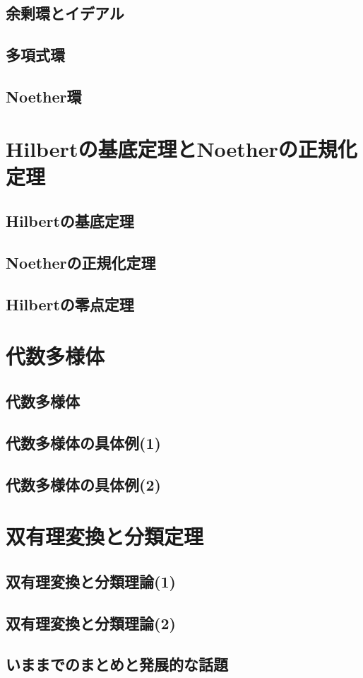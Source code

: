 \documentclass[dvipdfmx, leqno]{jsreport}
\begin{document}
\section{余剰環とイデアル}
\section{多項式環}
\section{Noether環}

\chapter{Hilbertの基底定理とNoetherの正規化定理}
\section{Hilbertの基底定理}
\section{Noetherの正規化定理}
\section{Hilbertの零点定理}

\chapter{代数多様体}
\section{代数多様体}
\section{代数多様体の具体例(1)}
\section{代数多様体の具体例(2)}

\chapter{双有理変換と分類定理}
\section{双有理変換と分類理論(1)}
\section{双有理変換と分類理論(2)}
\section{いままでのまとめと発展的な話題}
\end{document}
